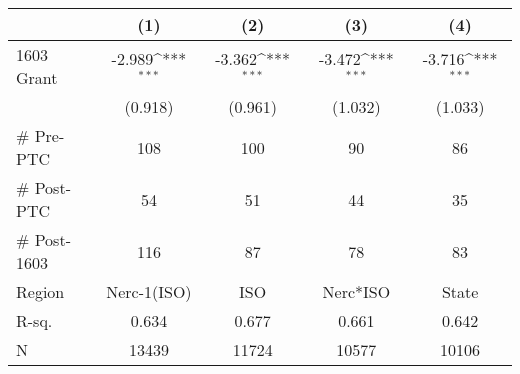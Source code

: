 {
\def\sym#1{\ifmmode^{#1}\else\(^{#1}\)\fi}
\begin{tabular}{l*{4}{c}}
\toprule
                    &\multicolumn{1}{c}{(1)}         &\multicolumn{1}{c}{(2)}         &\multicolumn{1}{c}{(3)}         &\multicolumn{1}{c}{(4)}         \\
\midrule
1603 Grant          &      -2.989\sym{***}&      -3.362\sym{***}&      -3.472\sym{***}&      -3.716\sym{***}\\
                    &     (0.918)         &     (0.961)         &     (1.032)         &     (1.033)         \\
\midrule
\# Pre-PTC          &         108         &         100         &          90         &          86         \\
\# Post-PTC         &          54         &          51         &          44         &          35         \\
\# Post-1603        &         116         &          87         &          78         &          83         \\
Region              & Nerc-1(ISO)         &         ISO         &    Nerc*ISO         &       State         \\
R-sq.               &       0.634         &       0.677         &       0.661         &       0.642         \\
N                   &       13439         &       11724         &       10577         &       10106         \\
\bottomrule
\end{tabular}
}
